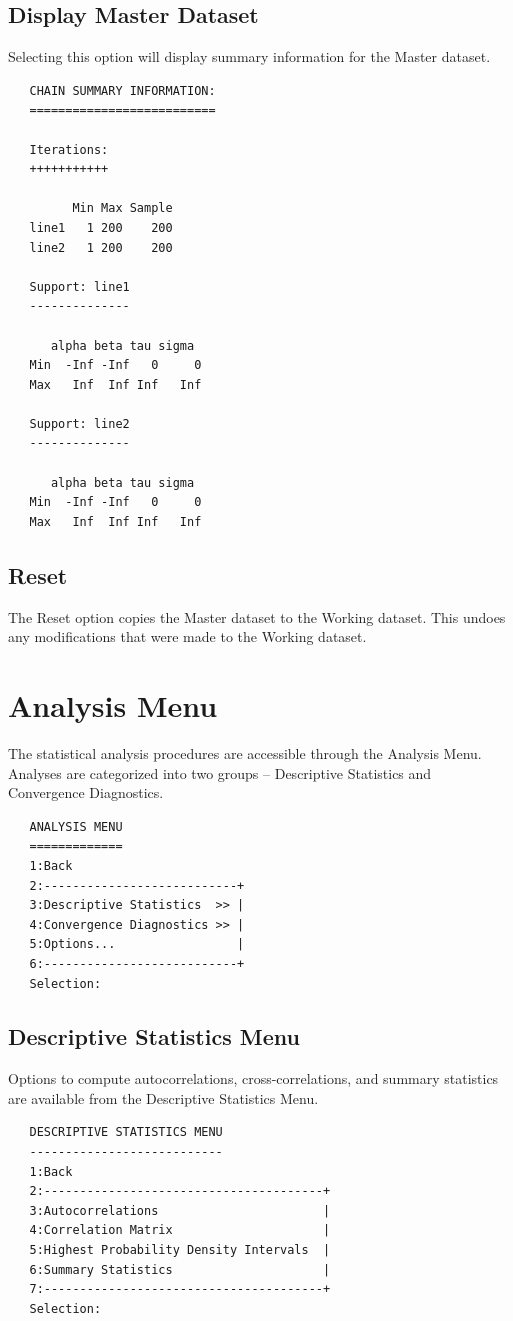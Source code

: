\documentclass[12pt,letterpaper]{report}
\begin{document}
\section{Display Master Dataset}
\noindent
Selecting this option will display summary information for the Master dataset.
\vskip 9pt
\begin{tiny}
\begin{verbatim}
   CHAIN SUMMARY INFORMATION:
   ==========================

   Iterations:
   +++++++++++

         Min Max Sample
   line1   1 200    200
   line2   1 200    200

   Support: line1
   --------------

      alpha beta tau sigma
   Min  -Inf -Inf   0     0
   Max   Inf  Inf Inf   Inf

   Support: line2
   --------------

      alpha beta tau sigma
   Min  -Inf -Inf   0     0
   Max   Inf  Inf Inf   Inf
\end{verbatim}
\end{tiny}

\section{Reset}
\noindent
The Reset option copies the Master dataset to the Working dataset. This undoes
any modifications that were made to the Working dataset.

\chapter{Analysis Menu}
\noindent
The statistical analysis procedures are accessible through the Analysis
Menu. Analyses are categorized into two groups -- Descriptive Statistics
and Convergence Diagnostics.
\vskip 9pt
\begin{tiny}
\begin{verbatim}
   ANALYSIS MENU
   =============
   1:Back
   2:---------------------------+
   3:Descriptive Statistics  >> |
   4:Convergence Diagnostics >> |
   5:Options...                 |
   6:---------------------------+
   Selection:
\end{verbatim}
\end{tiny}

\section{Descriptive Statistics Menu}
\noindent
Options to compute autocorrelations, cross-correlations, and summary statistics
are available from the Descriptive Statistics Menu.
\vskip 9pt
\begin{tiny}
\begin{verbatim}
   DESCRIPTIVE STATISTICS MENU
   ---------------------------
   1:Back
   2:---------------------------------------+
   3:Autocorrelations                       |
   4:Correlation Matrix                     |
   5:Highest Probability Density Intervals  |
   6:Summary Statistics                     |
   7:---------------------------------------+
   Selection:
\end{verbatim}
\end{tiny}
\end{document}
